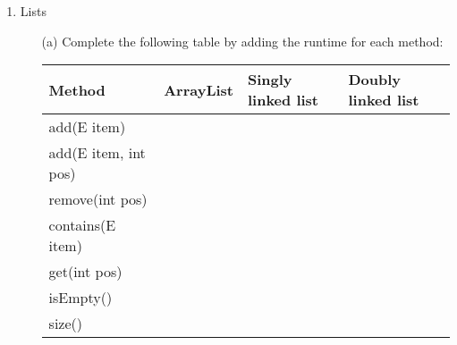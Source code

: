 \documentclass[letter]{article}
\begin{document}
\begin{enumerate} [1.]
\begin{itemize}
    \item [(d)] How does variable type and object type determines which methods we can perform?
        

    \item [(e)] In the constructor of VeryFun, what is the purpose of super(title)? What does it do?

        \begin{verbatim}
public class Fun {
    private String title;

    public Fun(String title) {
        this.title = title;
    }
    
    public void potato(int a) {
        System.out.println(a);
        System.out.println(title);
    }
}
public class VeryFun extends Fun {
    private String title2;

    public VeryFun(String title, String title2) {
        super(title); //WHY DO WE NEED THIS?
        this.title2 = title2;
    }

    public void potato(int a) {
        int b = a + 1;
        System.out.println(b);
    }

    public void strawberry() {
        System.out.print(title2);
    }

}
        
        \end{verbatim}

    \end{itemize}

    \item Lists
    \begin{itemize}
        \item [(a)] Complete the following table by adding the runtime for each method: 
        
        
        \begin{tabular}{|l|l|l|l|}
\hline
Method & ArrayList & Singly linked list & Doubly linked list \\ \hline
add(E item) &  &  &  \\ \hline
add(E item, int pos) &  &  &  \\ \hline
remove(int pos) &  &  &  \\ \hline
contains(E item) &  &  &  \\ \hline
get(int pos) &  &  &  \\ \hline
isEmpty() &  &  &  \\ \hline
size() &  &  &  \\ \hline
\end{tabular}



\end{itemize}
\end{enumerate}
\end{document}
